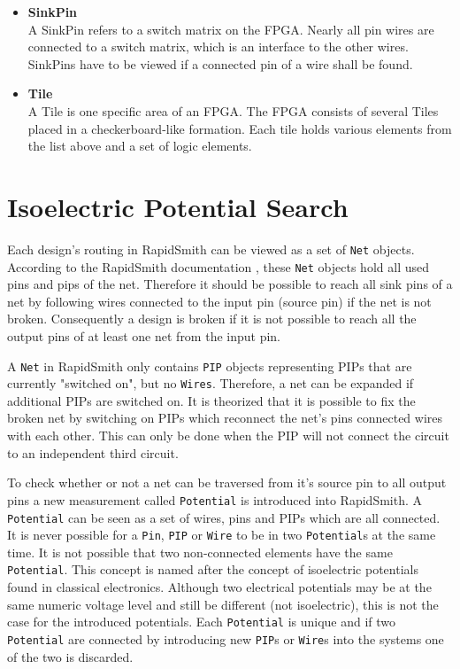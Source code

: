 \begin{itemize}
\item \textbf{SinkPin}\hfill \\
A SinkPin refers to a switch matrix on the FPGA. Nearly all pin wires are connected to a switch matrix, which is an interface to the other wires. SinkPins have to be viewed if a connected pin of a wire shall be found.
\item \textbf{Tile}\hfill \\
A Tile is one specific area of an FPGA. The FPGA consists of several Tiles placed in a checkerboard-like formation. Each tile holds various elements from the list above and a set of logic elements. 

\end{itemize}

\section{Isoelectric Potential Search}
\label{sec:isolectricelements}

Each design's routing in RapidSmith can be viewed as a set of \texttt{Net} objects. According to the RapidSmith documentation \cite{rapidsmith}, these \texttt{Net} objects hold all used pins and pips of the net.
Therefore it should be possible to reach all sink pins of a net by following wires connected to the input pin (source pin) if the net is not broken.
Consequently a design is broken if it is not possible to reach all the output pins of at least one net from the input pin.  

A \texttt{Net} in RapidSmith only contains \texttt{PIP} objects representing PIPs that are currently "switched on", but no \texttt{Wires}. Therefore, a net can be expanded if additional PIPs are switched on. 
It is theorized that it is possible to fix the broken net by switching on PIPs which reconnect the net's pins connected wires with each other. This can only be done when the PIP will not connect the circuit to an independent third circuit.

To check whether or not a net can be traversed from it's source pin to all output pins a new measurement called \texttt{Potential} is introduced into RapidSmith.
A \texttt{Potential} can be seen as a set of wires, pins and PIPs which are all connected. %
It is never possible for a \texttt{Pin}, \texttt{PIP} or \texttt{Wire} to be in two \texttt{Potential}s at the same time. It is not possible that two non-connected elements have the same \texttt{Potential}. 
This concept is named after the concept of isoelectric potentials found in classical electronics. Although two electrical potentials may be at the same numeric voltage level and still be different (not isoelectric), this is not the case for the introduced potentials. Each \texttt{Potential} is unique and if two \texttt{Potential} are connected by introducing new \texttt{PIP}s or \texttt{Wire}s into the systems one of the two is discarded.

